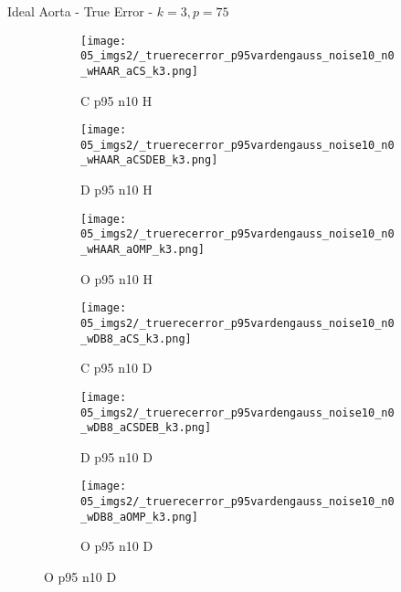 \begin{frame}{Ideal Aorta - True Error - $k=3,p=75$}{}
\begin{figure}
\begin{subfigure}{0.13\textwidth}
\texttt{[image: 05\_imgs2/\_truerecerror\_p95vardengauss\_noise10\_n0\_wHAAR\_aCS\_k3.png]}
\caption*{\tiny C p95 n10 H}
\end{subfigure}
\begin{subfigure}{0.13\textwidth}
\texttt{[image: 05\_imgs2/\_truerecerror\_p95vardengauss\_noise10\_n0\_wHAAR\_aCSDEB\_k3.png]}
\caption*{\tiny D p95 n10 H}
\end{subfigure}
\begin{subfigure}{0.13\textwidth}
\texttt{[image: 05\_imgs2/\_truerecerror\_p95vardengauss\_noise10\_n0\_wHAAR\_aOMP\_k3.png]}
\caption*{\tiny O p95 n10 H}
\end{subfigure}
\begin{subfigure}{0.13\textwidth}
\texttt{[image: 05\_imgs2/\_truerecerror\_p95vardengauss\_noise10\_n0\_wDB8\_aCS\_k3.png]}
\caption*{\tiny C p95 n10 D}
\end{subfigure}
\begin{subfigure}{0.13\textwidth}
\texttt{[image: 05\_imgs2/\_truerecerror\_p95vardengauss\_noise10\_n0\_wDB8\_aCSDEB\_k3.png]}
\caption*{\tiny D p95 n10 D}
\end{subfigure}
\begin{subfigure}{0.13\textwidth}
\texttt{[image: 05\_imgs2/\_truerecerror\_p95vardengauss\_noise10\_n0\_wDB8\_aOMP\_k3.png]}
\caption*{\tiny O p95 n10 D}
\end{subfigure}

\vspace{5pt}


\end{figure}
\end{frame}
